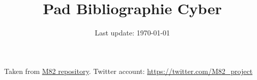 \documentclass[12pt,a4paper]{article}
\author{Last update: \today}
\title{Pad Bibliographie Cyber}
\date{}
\begin{document}
\maketitle
Taken from \href{https://github.com/M82-project/Bibliography}{M82 repository}. Twitter account: \url{https://twitter.com/M82_project}\nocite{*}
\renewcommand{\thepage}{}


\end{document}
